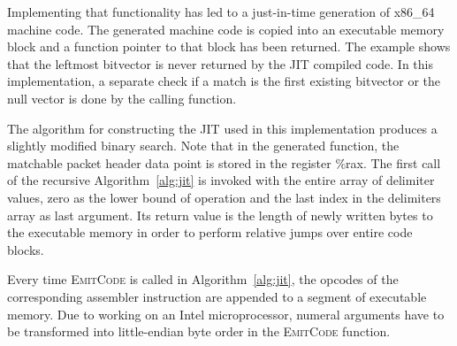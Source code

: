 \documentclass[conference]{IEEEtran}
\begin{document}

Implementing that functionality has led to a just-in-time generation of x86\_64 machine code.
The generated machine code is copied into an executable memory block and a function pointer to that block has been returned.
The example shows that the leftmost bitvector is never returned by the JIT compiled code.
In this implementation, a separate check if a match is the first existing bitvector or the null 
vector is done by the calling function.

The algorithm for constructing the JIT used in this implementation produces a slightly modified binary search.
Note that in the generated function, the matchable packet header data point is stored in the register \textsf{\%rax}.
The first call of the recursive Algorithm~\ref{alg:jit} is invoked with the entire array of delimiter values,
zero as the lower bound of operation and the last index in the delimiters array as last argument.
Its return value is the length of newly written bytes to the executable memory in order to perform relative jumps over entire code blocks.

Every time \textsc{EmitCode} is called in Algorithm~\ref{alg:jit}, the opcodes 
of the corresponding assembler instruction are appended to a segment of executable memory.
Due to working on an Intel microprocessor, numeral arguments have to be 
transformed into little-endian byte order in the \textsc{EmitCode} function.
\end{document}
